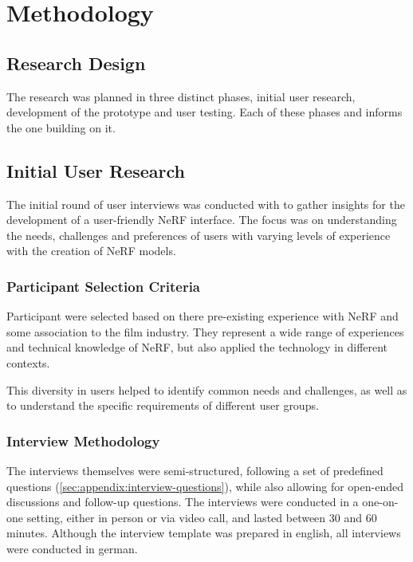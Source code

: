 %
\chapter{Methodology}
\label{sec:methodology}

\section{Research Design}
\label{sec:methodology:design}

The research was planned in three distinct phases, initial user research, development of the prototype and user testing. Each of these phases and informs the one building on it. 

\section{Initial User Research}
\label{sec:methodology:user-research}

The initial round of user interviews was conducted with to gather insights for the development of a user-friendly NeRF interface. The focus was on understanding the needs, challenges and preferences of users with varying levels of experience with the creation of NeRF models.

\subsection{Participant Selection Criteria}
\label{sec:methodology:user-research:criteria}

Participant were selected based on there pre-existing experience with NeRF and some association to the film industry. They represent a wide range of experiences and technical knowledge of NeRF, but also applied the technology in different contexts.

This diversity in users helped to identify common needs and challenges, as well as to understand the specific requirements of different user groups.

\subsection{Interview Methodology}
\label{sec:methodology:user-research:interview}

The interviews themselves were semi-structured, following a set of predefined questions (\ref{sec:appendix:interview-questions}), while also allowing for open-ended discussions and follow-up questions. 
The interviews were conducted in a one-on-one setting, either in person or via video call, and lasted between 30 and 60 minutes. Although the interview template was prepared in english, all interviews were conducted in german.

